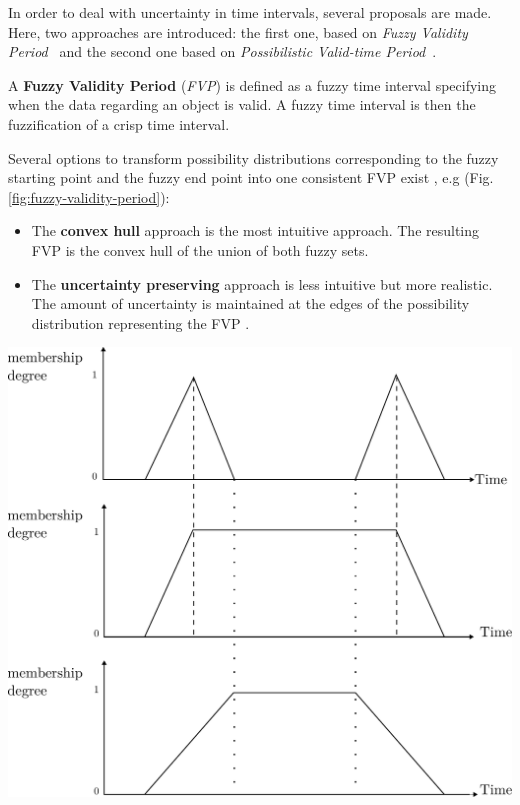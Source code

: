 In order to deal with uncertainty in time intervals, several proposals are made. Here, two approaches are introduced: the first one, based on \emph{Fuzzy Validity Period}~\cite{Garrido2009} and the second one based on \emph{Possibilistic Valid-time Period}~\cite{JoseEnriquePons2012}.

\begin{definition}
A \textbf{Fuzzy Validity Period} (\emph{FVP}) is defined as a fuzzy time interval specifying when the data regarding an object is valid. A fuzzy time interval is then the fuzzification of a crisp time interval.
\end{definition}
Several options to transform possibility distributions corresponding to the fuzzy starting point and the fuzzy end point into one consistent FVP exist \cite{Garrido2009}, e.g (Fig. \ref{fig:fuzzy-validity-period}):
\begin{itemize}
\item The \textbf{convex hull} approach is the most intuitive approach. The resulting FVP is the convex hull of the union of both fuzzy sets.
\item The \textbf{uncertainty preserving} approach is less intuitive but more realistic. The amount of uncertainty is maintained at the edges of the possibility distribution representing the FVP \cite{Garrido2009}.
\end{itemize}

\vspace*{13pt}
\begin{center}
{
\includegraphics[scale=0.25]{./graphs/comparisoncv.pdf}

}
\end{center}
\vspace*{10pt}
\vspace*{13pt}

